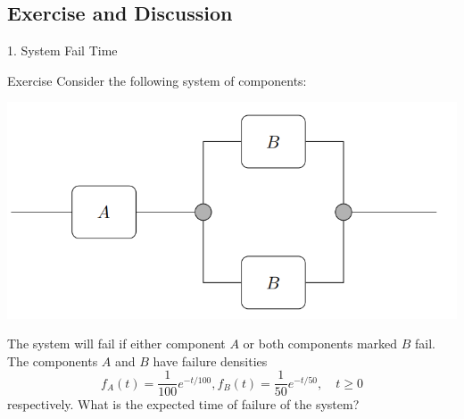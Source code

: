 \documentclass{beamer}
\begin{document}
\subsection{Exercise and Discussion}
\begin{frame}{1. System Fail Time}
\begin{block}{Exercise}
Consider the following system of components:
\begin{center}
\includegraphics[scale=0.25]{system.png}
\end{center}
The system will fail if either component $A$ or both components marked $B$ fail. The components $A$ and $B$ have failure densities
$$
f_{A}(t)=\frac{1}{100} e^{-t / 100}
,
f_{B}(t)=\frac{1}{50} e^{-t / 50}, \quad t \geq 0
$$
respectively. What is the expected time of failure of the system?
\end{block}
\end{frame}
\end{document}
